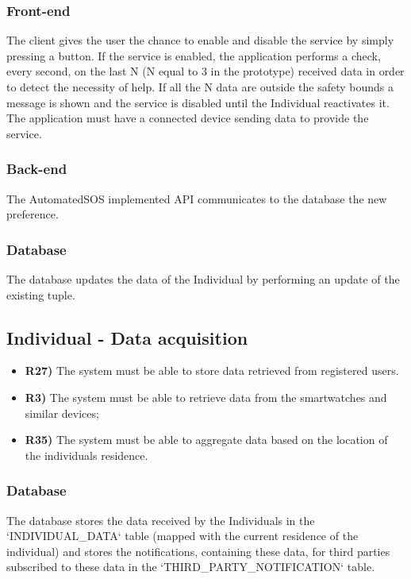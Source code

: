 \subsubsection*{Front-end}
The client gives the user the chance to enable and disable the service by simply pressing a button. If the service is enabled, the application performs a check, every second, on the last N (N equal to 3 in the prototype) received data in order to detect the necessity of help. If all the N data are outside the safety bounds a message is shown and the service is disabled until the Individual reactivates it.
The application must have a connected device sending data to provide the service.

\subsubsection*{Back-end}
The AutomatedSOS implemented API communicates to the database the new preference. 

\subsubsection*{Database}
The database updates the data of the Individual by performing an update of the existing tuple.


\subsection{Individual - Data acquisition}
\begin{itemize}	
	\item {\color{Green}\textbf{R27)}} The system must be able to store data retrieved from registered users.
	\item {\color{Red}\textbf{R3)}} The system must be able to retrieve data from the smartwatches and similar devices;
	\item {\color{Green}\textbf{R35)}} The system must be able to aggregate data based on the location of the individuals residence.\\
\end{itemize}

\subsubsection*{Database}
The database stores the data received by the Individuals in the `INDIVIDUAL\_DATA` table  (mapped with the current residence of the individual) and stores the notifications, containing these data, for third parties subscribed to these data in the `THIRD\_PARTY\_NOTIFICATION` table.

